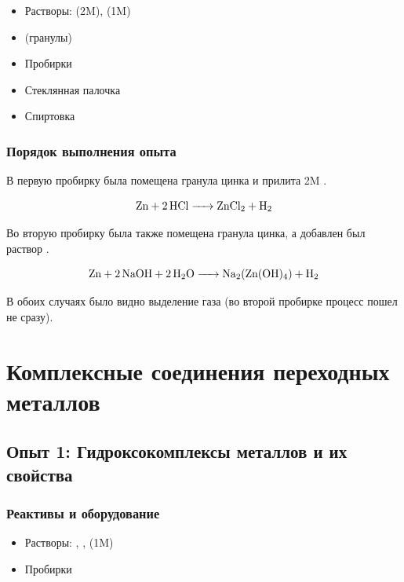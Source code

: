 \documentclass[a4paper, 12pt]{article}
\begin{document}
\begin{itemize}
	\item Растворы:  (2M),  (1M)
	
	\item {} (гранулы)
	
	\item Пробирки
	\item Стеклянная палочка
	\item Спиртовка
\end{itemize}

\subsubsection{Порядок выполнения опыта}

В первую пробирку была помещена гранула цинка и прилита 2M .

\begin{equation}
	\ce{Zn + 2HCl -> ZnCl2 + H2}
\end{equation}

Во вторую пробирку была также помещена гранула цинка, а добавлен был раствор .

\begin{equation}
	\ce{Zn + 2NaOH + 2H2O -> Na2(Zn(OH)4) + H2}
\end{equation}

В обоих случаях было видно выделение газа (во второй пробирке процесс пошел не сразу).

\newpage

\section{Комплексные соединения переходных металлов}


\subsection{Опыт 1: Гидроксокомплексы металлов и их свойства}

\subsubsection{Реактивы и оборудование}

\begin{itemize}
	\item Растворы: , ,  (1M)
	
	\item Пробирки
\end{itemize}
\end{document}
